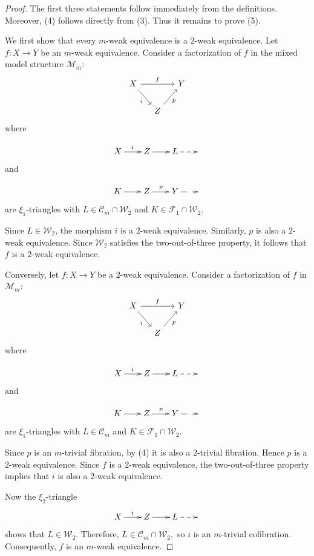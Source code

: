 \documentclass[11pt,a4paper]{amsart}
\numberwithin{equation}{section}
\theoremstyle{plain}
\begin{document}
\begin{proof}
	The first three statements follow immediately from the definitions. Moreover, (4) follows directly from (3). Thus it remains to prove (5).
	
	We first show that every $m$-weak equivalence is a $2$-weak equivalence. Let
	\(
	f:X\to Y
	\)
	be an $m$-weak equivalence. Consider a factorization of \(f\) in the mixed model structure \(\mathcal{M}_m\):
	\[
	\begin{tikzcd}[column sep=small]
		X \arrow[rr,"f"] \arrow[dr,"i"']
		&& Y \\
		& Z \arrow[ur,"p"'] &
	\end{tikzcd}
	\]
	where

	\[
	\xymatrix@C=2em{
		X  \ar[r]^i &
		Z \ar[r] &
		L\ar@{-->}[r] &
		{}
	}
	\]
	and

	\[
	\xymatrix@C=2em{
		K \ar[r] &
		Z \ar[r]^p &
		 Y\ar@{-->}[r] &
		{}
	}
	\]
	are \(\xi_1\)-triangles with
	\(
	L\in\mathcal{C}_m\cap\mathcal{W}_2
	\)
	and
	\(
	K\in\mathcal{F}_1\cap\mathcal{W}_2.
	\)
	
	Since \(L\in\mathcal{W}_2\), the morphism \(i\) is a $2$-weak equivalence. Similarly, \(p\) is also a $2$-weak equivalence. Since \(\mathcal{W}_2\) satisfies the two-out-of-three property, it follows that \(f\) is a $2$-weak equivalence.
	
	Conversely, let
	\(
	f:X\to Y
	\)
	be a $2$-weak equivalence. Consider a factorization of \(f\) in \(\mathcal{M}_m\):
	\[
	\begin{tikzcd}[column sep=small]
		X \arrow[rr,"f"] \arrow[dr,"i"']
		&& Y \\
		& Z \arrow[ur,"p"'] &
	\end{tikzcd}
	\]
	where

\[
\xymatrix@C=2em{
	X  \ar[r]^i &
	Z \ar[r] &
	L\ar@{-->}[r] &
	{}
}
\]
and

\[
\xymatrix@C=2em{
	K \ar[r] &
	Z \ar[r]^p &
	Y\ar@{-->}[r] &
	{}
}
\]
are \(\xi_1\)-triangles with
	\(
	L\in\mathcal{C}_m
	\)
	and
	\(
	K\in\mathcal{F}_1\cap\mathcal{W}_2.
	\)
	
	Since \(p\) is an $m$-trivial fibration, by (4) it is also a $2$-trivial fibration. Hence \(p\) is a $2$-weak equivalence. Since \(f\) is a $2$-weak equivalence, the two-out-of-three property implies that \(i\) is also a $2$-weak equivalence.
	
	Now the \(\xi_2\)-triangle
	\[
	\xymatrix@C=2em{
		X  \ar[r]^i &
		Z \ar[r] &
		L\ar@{-->}[r] &
		{}
	}
	\]
	shows that \(L\in\mathcal{W}_2\). Therefore,
	\(
	L\in\mathcal{C}_m\cap\mathcal{W}_2,
	\)
	so \(i\) is an $m$-trivial cofibration. Consequently, \(f\) is an $m$-weak equivalence.
	

\end{proof}
\end{document}
